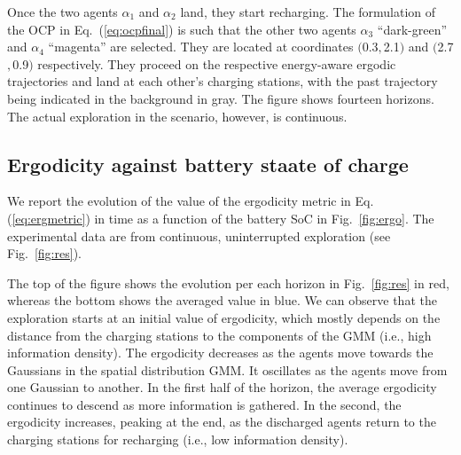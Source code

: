 \documentclass[letterpaper,10pt,conference,twoside]{IEEEtran}
\theoremstyle{definition}
\begin{document}
Once the two agents $\alpha_1$ and $\alpha_2$ land, they start recharging. The formulation of the OCP in Eq.~(\ref{eq:ocpfinal}) is such that the other two agents $\alpha_3$ ``dark-green'' and $\alpha_4$ ``magenta'' are selected. They are located at coordinates $($0.3$,$2.1$)$ and $($2.7$,$0.9$)$ respectively. They proceed on the respective energy-aware ergodic trajectories and land at each other's charging stations, with the past trajectory being indicated in the background in gray. The figure shows fourteen horizons. The actual exploration in the scenario, however, is continuous. 

\subsection*{Ergodicity against battery staate of charge}
\noindent
We report the evolution of the value of the ergodicity metric in Eq. (\ref{eq:ergmetric}) in time as a function of the battery SoC in Fig.~\ref{fig:ergo}. The experimental data are from continuous, uninterrupted exploration (see Fig.~\ref{fig:res}).

The top of the figure shows the evolution per each horizon in Fig.~\ref{fig:res} in red, whereas the bottom shows the averaged value in blue. We can observe that the exploration starts at an initial value of ergodicity, which mostly depends on the distance from the charging stations to the components of the GMM (i.e., high information density). The ergodicity decreases as the agents move towards the Gaussians in the spatial distribution GMM. It oscillates as the agents move from one Gaussian to another. In the first half of the horizon, the average ergodicity continues to descend as more information is gathered. In the second, the ergodicity increases, peaking at the end, as the discharged agents return to the charging stations for recharging (i.e., low information density).


\end{document}
